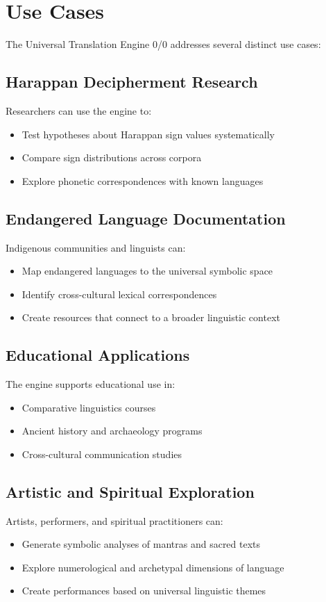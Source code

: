 \section{Use Cases}
\label{sec:use-cases}

The Universal Translation Engine 0/0 addresses several distinct use cases:

\subsection{Harappan Decipherment Research}
Researchers can use the engine to:
\begin{itemize}
  \item Test hypotheses about Harappan sign values systematically
  \item Compare sign distributions across corpora
  \item Explore phonetic correspondences with known languages
\end{itemize}

\subsection{Endangered Language Documentation}
Indigenous communities and linguists can:
\begin{itemize}
  \item Map endangered languages to the universal symbolic space
  \item Identify cross-cultural lexical correspondences
  \item Create resources that connect to a broader linguistic context
\end{itemize}

\subsection{Educational Applications}
The engine supports educational use in:
\begin{itemize}
  \item Comparative linguistics courses
  \item Ancient history and archaeology programs
  \item Cross-cultural communication studies
\end{itemize}

\subsection{Artistic and Spiritual Exploration}
Artists, performers, and spiritual practitioners can:
\begin{itemize}
  \item Generate symbolic analyses of mantras and sacred texts
  \item Explore numerological and archetypal dimensions of language
  \item Create performances based on universal linguistic themes
\end{itemize}
